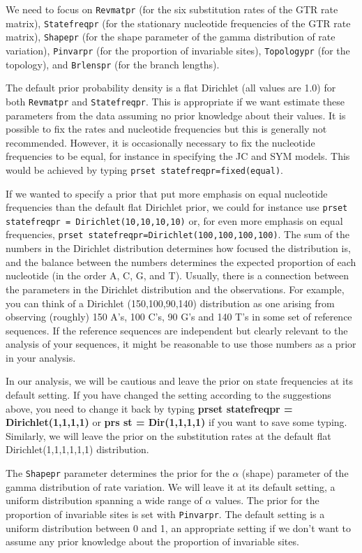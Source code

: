 \documentclass[12pt]{book}
\begin{document}
We need to focus on \texttt{Revmatpr} (for the six substitution rates of the GTR rate matrix),
 \texttt{Statefreqpr} (for the stationary nucleotide frequencies of the GTR rate matrix), \texttt{Shapepr}
 (for the shape parameter of the gamma distribution of rate variation), \texttt{Pinvarpr}
 (for the proportion of invariable sites), \texttt{Topologypr} (for the topology), and \texttt{Brlenspr}
 (for the branch lengths).

The default prior probability density is a flat Dirichlet (all values are 1.0) for both \texttt{Revmatpr}
 and \texttt{Statefreqpr}. This is appropriate if we want estimate these parameters from the data assuming
 no prior knowledge about their values. It is possible to fix the rates and nucleotide frequencies but this
 is generally not recommended. However, it is occasionally necessary to fix the nucleotide frequencies to
 be equal, for instance in specifying the JC and SYM models. This would be achieved by typing
 \texttt{prset statefreqpr=fixed(equal)}.

If we wanted to specify a prior that put more emphasis on equal nucleotide frequencies than the default
 flat Dirichlet prior, we could for instance use \texttt{prset statefreqpr = Dirichlet(10,10,10,10)} or,
 for even more emphasis on equal frequencies, \texttt{prset statefreqpr=Dirichlet(100,100,100,100)}. The
 sum of the numbers in the Dirichlet distribution determines how focused the distribution is, and the
 balance between the numbers determines the expected proportion of each nucleotide (in the order A, C, G,
 and T). Usually, there is a connection between the parameters in the Dirichlet distribution and the
 observations. For example, you can think of a Dirichlet (150,100,90,140) distribution as one arising from
 observing (roughly) 150 A's, 100 C's, 90 G's and 140 T's in some set of reference sequences. If the
 reference sequences are independent but clearly relevant to the analysis of your sequences, it might be
 reasonable to use those numbers as a prior in your analysis. 

In our analysis, we will be cautious and leave the prior on state frequencies at its default setting. If you
 have changed the setting according to the suggestions above, you need to change it back by typing
 \textbf{prset statefreqpr = Dirichlet(1,1,1,1)} or \textbf{prs st = Dir(1,1,1,1)} if you want to save some
 typing. Similarly, we will leave the prior on the substitution rates at the default flat
 Dirichlet(1,1,1,1,1,1) distribution.

The \texttt{Shapepr} parameter determines the prior for the $\alpha$ (shape) parameter of the gamma
 distribution of rate variation. We will leave it at its default setting, a uniform distribution spanning
 a wide range of $\alpha$ values. The prior for the proportion of invariable sites is set with
 \texttt{Pinvarpr}. The default setting is a uniform distribution between 0 and 1, an appropriate setting
 if we don't want to assume any prior knowledge about the proportion of invariable sites.
\end{document}
